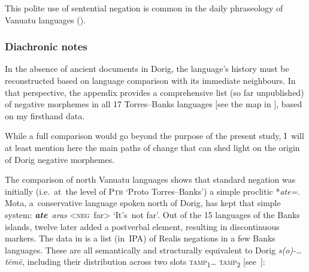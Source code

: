 \documentclass[output=paper,colorlinks,citecolor=brown,draft]{langscibook}
\begin{document}
\noindent This polite use of sentential negation is common in the daily phraseology of Vanuatu languages (\citealt[221]{François2011}).

\subsubsection{Diachronic notes}\label{sec:dor:5} 
In the absence of ancient documents in Dorig, the language’s history must be reconstructed based on language comparison with its immediate neighbours. In that perspective, the appendix provides a comprehensive list (so far unpublished) of negative morphemes in all 17 Torres–Banks languages [see the map in ], based on my firsthand data.

While a full comparison would go beyond the purpose of the present study, I~will at least mention here the main paths of change that can shed light on the origin of Dorig negative morphemes.

\label{sec:dor:5.1}

The comparison of north Vanuatu languages shows that standard negation was initially (i.e.~at~the level of \textsc{Ptb} ‘Proto Torres–Banks’) a simple proclitic *\textit{ate=}. Mota, a~conservative language spoken north of Dorig, has kept that simple \mbox{system}: \textbf{\textit{ate}}\textit{~aras} <\textsc{neg}~far> ‘It’s~not far’. Out of the 15 languages of the Banks islands, twelve later added a postverbal element, resulting in discontinuous markers. The data in  is a list (in~IPA) of Realis negations in a few Banks languages. These are all semantically and structurally equivalent to Dorig \textit{s(o)-… tēmē}, including their distribution across two slots \textsc{tamp}\textsubscript{1}… \textsc{tamp}\textsubscript{2} [see~]:

\end{document}
